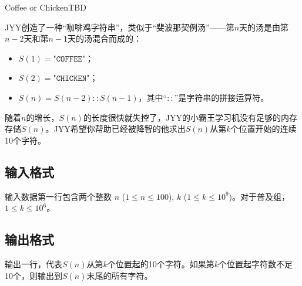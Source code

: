 \begin{Problem}{Coffee or Chicken}{TBD}

JYY创造了一种“咖啡鸡字符串”，类似于“斐波那契例汤”——第$n$天的汤是由第$n-2$天和第$n-1$天的汤混合而成的：

\begin{itemize}
  \item $S(1) = \texttt{"COFFEE"}$；
  \item $S(2) = \texttt{"CHICKEN"}$；
  \item $S(n) = S(n - 2) :: S(n - 1)$，其中“$::$”是字符串的拼接运算符。
\end{itemize}

随着$n$的增长，$S(n)$的长度很快就失控了，JYY的小霸王学习机没有足够的内存存储$S(n)$。JYY希望你帮助已经被降智的他求出$S(n)$从第$k$个位置开始的连续10个字符。

\subsection*{输入格式}

输入数据第一行包含两个整数 $n$ ($1\le n\le 100$), $k$ ($1\le k\le 10^9$)。对于普及组，$1\le k\le 10^6$。

\subsection*{输出格式}

输出一行，代表$S(n)$从第$k$个位置起的10个字符。如果第$k$个位置起字符数不足10个，则输出到$S(n)$末尾的所有字符。


\end{Problem}
